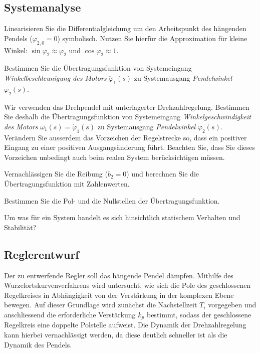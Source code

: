 \documentclass[a4paper,11pt]{scrartcl}
\begin{document}
\subsection*{Systemanalyse}

\begin{aufgaben}
    \item Linearisieren Sie die Differentialgleichung um den Arbeitspunkt des hängenden Pendels ($\varphi_{2,0} = 0$) symbolisch. Nutzen Sie hierfür die Approximation für kleine Winkel: $\sin\varphi_2 \approx \varphi_2$ und $\cos\varphi_2 \approx 1$.
    \item Bestimmen Sie die Übertragungsfunktion von Systemeingang \emph{Winkelbeschleunigung des Motors} $\ddot{\varphi}_1(s)$ zu Systemausgang \emph{Pendelwinkel} $\varphi_2(s)$.
    \item Wir verwenden das Drehpendel mit unterlagerter Drehzahlregelung. Bestimmen Sie deshalb die Übertragungsfunktion von Systemeingang \emph{Winkelgeschwindigkeit des Motors} $\omega_1(s)=\dot{\varphi}_1(s)$ zu Systemausgang \emph{Pendelwinkel} $\varphi_2(s)$. Verändern Sie ausserdem das Vorzeichen der Regelstrecke so, dass ein positiver Eingang zu einer positiven Ausgangsänderung führt. Beachten Sie, dass Sie dieses Vorzeichen unbedingt auch beim realen System berücksichtigen müssen.
    \item Vernachlässigen Sie die Reibung ($b_2 = 0$) und berechnen Sie die Übertragungsfunktion mit Zahlenwerten.
    \item Bestimmen Sie die Pol- und die Nullstellen der Übertragungsfunktion.
    \item Um was für ein System handelt es sich hinsichtlich statischem Verhalten und Stabilität?
\end{aufgaben}

\begin{answerboxfillpage}\end{answerboxfillpage}

\begin{answerbox}[8]\end{answerbox}

\subsection*{Reglerentwurf}

Der zu entwerfende Regler soll das hängende Pendel dämpfen. Mithilfe des Wurzelortskurvenverfahrens wird untersucht, wie sich die Pole des geschlossenen Regelkreises in Abhängigkeit von der Verstärkung in der komplexen Ebene bewegen. Auf dieser Grundlage wird zunächst die Nachstellzeit $T_i$ vorgegeben und anschliessend die erforderliche Verstärkung $k_p$ bestimmt, sodass der geschlossene Regelkreis eine doppelte Polstelle aufweist. Die Dynamik der Drehzahlregelung kann hierbei vernachlässigt werden, da diese deutlich schneller ist als die Dynamik des Pendels.
\end{document}

